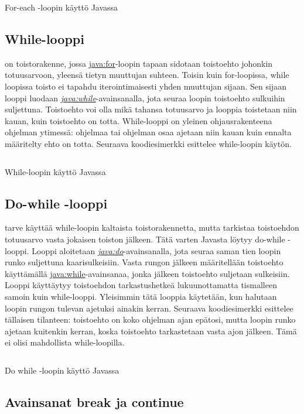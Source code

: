 \documentclass{tufte-book}
\newcommand{\java}[1]{\underline{\gls{java:#1}}}
\newcommand{\newjava}[1]{\textit{\java{#1}}}
\newcommand{\code}[3]{
\begin{listing}
    \inputminted{java}{OhjelmointiopasEsimerkit/src/#1/#2.java}
    \caption{#3}
    \label{Java-#1-#2}
\end{listing}
}
\begin{document}
\code{week3}{BasicForEachLoop}{For-each -loopin käyttö Javassa}

\subsection{While-looppi}
\label{while}

 on toistorakenne, jossa \java{for}-loopin tapaan sidotaan toistoehto
johonkin totuusarvoon, yleensä tietyn muuttujan suhteen. Toisin kuin for-loopissa, while loopissa
toisto ei tapahdu iterointimaisesti yhden muuttujan sijaan. Sen sijaan looppi luodaan
\newjava{while}-avainsanalla, jota seuraa loopin toistoehto sulkuihin suljettuna. Toistoehto
voi olla mikä tahansa totuusarvo ja looppia toistetaan niin kauan, kuin toistoehto on totta.
While-looppi on yleinen ohjausrakenteena ohjelman ytimessä: ohjelmaa tai ohjelman osaa ajetaan
niin kauan kuin ennalta määritelty ehto on totta. Seuraava koodiesimerkki esittelee while-loopin
käytön.

\code{week3}{BasicWhileLoop}{While-loopin käyttö Javassa}

\subsection{Do-while -looppi}
\label{do while}

 tarve käyttää while-loopin kaltaista toistorakennetta, mutta
tarkistaa toistoehdon totuusarvo vasta jokaisen toiston jälkeen. Tätä varten Javasta löytyy 
do-while -looppi. Looppi aloitetaan \newjava{do}-avainsanalla, jota seuraa saman tien loopin
runko suljettuna kaarisulkeisiin. Vasta rungon jälkeen määritellään toistoehto käyttämällä
\java{while}-avainsanaa, jonka jälkeen toistoehto suljetaan sulkeisiin. Looppi käyttäytyy
toistoehdon tarkastushetkeä lukuunottamatta tismalleen samoin kuin while-looppi. Yleisimmin tätä
looppia käytetään, kun halutaan loopin rungon tulevan ajetuksi ainakin kerran. Seuraava
koodiesimerkki esittelee tällaisen tilanteen: toistoehto on koko ohjelman ajan epätosi, mutta
loopin runko ajetaan kuitenkin kerran, koska toistoehto tarkastetaan vasta ajon jälkeen. Tämä ei
olisi mahdollista while-loopilla.

\code{week3}{BasicDoWhileLoop}{Do while -loopin käyttö Javassa}

\subsection{Avainsanat break ja continue}
\label{break continue}
\end{document}
